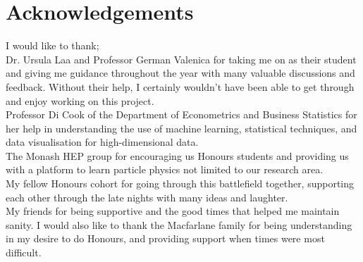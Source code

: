 \documentclass[12pt,a4paper]{report}
\begin{document}
\centerline{\textit{}} 
\newpage

\vspace*{4cm}
\section*{Acknowledgements}
\thispagestyle{plain}

I would like to thank; \\

\noindent Dr. Ursula Laa and Professor German Valenica for taking me on as their student and giving me guidance throughout the year with many valuable discussions and feedback. Without their help, I certainly wouldn't have been able to get through and enjoy working on this project. \\

\noindent Professor Di Cook of the Department of Econometrics and Business Statistics for her help in understanding the use of machine learning, statistical techniques, and data visualisation for high-dimensional data. \\

\noindent The Monash HEP group for encouraging us Honours students and providing us with a platform to learn particle physics not limited to our research area. \\

\noindent My fellow Honours cohort for going through this battlefield together, supporting each other through the late nights with many ideas and laughter.  \\

\noindent My friends for being supportive and the good times that helped me maintain sanity. I would also like to thank the Macfarlane family for being understanding in my desire to do Honours, and providing support when times were most difficult. 





\clearpage
\setcounter{page}{4}

\makeatletter
\renewcommand\tableofcontents{%
    \if@twocolumn
      \@restonecoltrue\onecolumn
    \else
      \@restonecolfalse
    \fi
   \newgeometry{top=0.6cm, bottom=2.5cm, left=2cm, right=2cm}
    \chapter*{\contentsname
        \@mkboth{%
           \MakeUppercase\contentsname}{\MakeUppercase\contentsname}}%
    \vspace{-2cm}
    \@starttoc{toc}%
    \if@restonecol\twocolumn\fi
    \restoregeometry
    }
\makeatother
\end{document}
